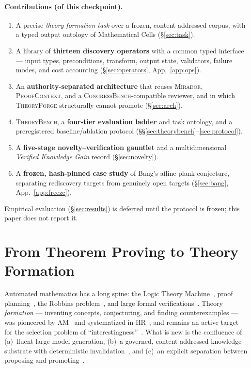 \documentclass[11pt]{amsart}
\theoremstyle{definition}
\theoremstyle{remark}
\newcommand{\mirador}{\textsc{Mirador}}
\newcommand{\pc}{\textsc{ProofContext}}
\newcommand{\cb}{\textsc{CongressBench}}
\newcommand{\tf}{\textsc{TheoryForge}}
\newcommand{\tb}{\textsc{TheoryBench}}
\begin{document}
\paragraph{Contributions (of this checkpoint).}
\begin{enumerate}
\item A precise \emph{theory-formation task} over a frozen, content-addressed
corpus, with a typed output ontology of Mathematical Cells
(\S\ref{sec:task}).
\item A library of \textbf{thirteen discovery operators} with a common typed
interface --- input types, preconditions, transform, output state, validators,
failure modes, and cost accounting (\S\ref{sec:operators}, App.~\ref{app:ops}).
\item An \textbf{authority-separated architecture} that reuses \mirador{},
\pc{}, and a \cb{}-compatible reviewer, and in which \tf{} structurally cannot
promote (\S\ref{sec:arch}).
\item \tb{}, a \textbf{four-tier evaluation ladder} and task ontology, and a
preregistered baseline/ablation protocol (\S\S\ref{sec:theorybench}--\ref{sec:protocol}).
\item A \textbf{five-stage novelty--verification gauntlet} and a multidimensional
\emph{Verified Knowledge Gain} record (\S\ref{sec:novelty}).
\item A \textbf{frozen, hash-pinned case study} of Bang's affine plank
conjecture, separating rediscovery targets from genuinely open targets
(\S\ref{sec:bang}, App.~\ref{app:freeze}).
\end{enumerate}
Empirical evaluation (\S\ref{sec:results}) is deferred until the protocol is
frozen; this paper does not report it.

\section{From Theorem Proving to Theory Formation}\label{sec:fromproving}

Automated mathematics has a long spine: the Logic Theory
Machine~\cite{NewellSimon57}, proof planning~\cite{Bundy88}, the Robbins
problem~\cite{McCune97}, and large formal verifications~\cite{AppelHaken77,
Gonthier08, Hales17, Heule16}. Theory \emph{formation} --- inventing concepts,
conjecturing, and finding counterexamples --- was pioneered by AM~\cite{Lenat77}
and systematized in HR~\cite{Colton02}, and remains an active target for the
selection problem of ``interestingness''~\cite{Interestingness25}. What is new
is the confluence of (a)~fluent large-model generation, (b)~a governed,
content-addressed knowledge substrate with deterministic
invalidation~\cite{lucius2026mirador}, and (c)~an explicit separation between
proposing and promoting~\cite{lucius2026engine}.
\end{document}
